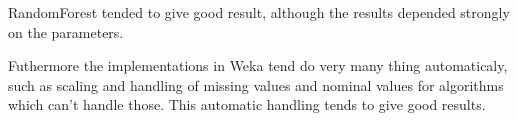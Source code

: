 \documentclass[a4paper]{article}
\begin{document}
RandomForest tended to give good result, although the results depended strongly
on the parameters. 

Futhermore the implementations in Weka tend do very many thing automaticaly,
such as scaling and handling of missing values and nominal values for algorithms
which can't handle those. This automatic handling tends to give good results.
\end{document}
